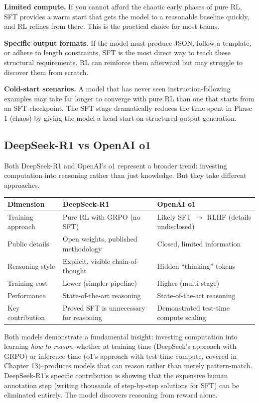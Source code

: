 \begin{chapterenv}
\textbf{Limited compute.} If you cannot afford the chaotic early phases of pure RL, SFT provides a warm start that gets the model to a reasonable baseline quickly, and RL refines from there. This is the practical choice for most teams.

\textbf{Specific output formats.} If the model must produce JSON, follow a template, or adhere to length constraints, SFT is the most direct way to teach these structural requirements. RL can reinforce them afterward but may struggle to discover them from scratch.

\textbf{Cold-start scenarios.} A model that has never seen instruction-following examples may take far longer to converge with pure RL than one that starts from an SFT checkpoint. The SFT stage dramatically reduces the time spent in Phase 1 (chaos) by giving the model a head start on structured output generation.

\subsection{DeepSeek-R1 vs OpenAI o1}

Both DeepSeek-R1 and OpenAI's o1 represent a broader trend: investing computation into reasoning rather than just knowledge. But they take different approaches.

\begin{center}
\begin{tabular}{p{}p{}p{}}
\toprule
\textbf{Dimension} & \textbf{DeepSeek-R1} & \textbf{OpenAI o1} \\
\midrule
Training approach & Pure RL with GRPO (no SFT) & Likely SFT $\to$ RLHF (details undisclosed) \\
Public details & Open weights, published methodology & Closed, limited information \\
Reasoning style & Explicit, visible chain-of-thought & Hidden ``thinking'' tokens \\
Training cost & Lower (simpler pipeline) & Higher (multi-stage) \\
Performance & State-of-the-art reasoning & State-of-the-art reasoning \\
Key contribution & Proved SFT is unnecessary for reasoning & Demonstrated test-time compute scaling \\
\bottomrule
\end{tabular}
\end{center}

\begin{tipbox}
Both models demonstrate a fundamental insight: investing computation into learning \textit{how to reason}--whether at training time (DeepSeek's approach with GRPO) or inference time (o1's approach with test-time compute, covered in Chapter 13)--produces models that can reason rather than merely pattern-match. DeepSeek-R1's specific contribution is showing that the expensive human annotation step (writing thousands of step-by-step solutions for SFT) can be eliminated entirely. The model discovers reasoning from reward alone.
\end{tipbox}


\end{chapterenv}

